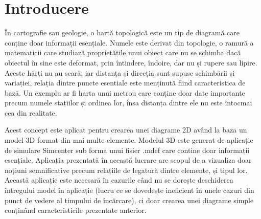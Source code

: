 \newpage
\section{Introducere}


În cartografie sau geologie, o hartă topologică este un tip de diagramă care conține doar informații esențiale. 
Numele este derivat din topologie, o ramură a matematicii care studiază proprietățile unui obiect care nu se schimba dacă 
obiectul în sine este deformat, prin întindere, îndoire, dar nu și rupere sau lipire. Aceste hărți nu au scară, iar distanța 
și direcția sunt supuse schimbării și variației, relația dintre puncte esentiale este menținută fiind caracteristica de bază. 
Un exemplu ar fi harta unui metrou care conține doar date importante precum numele stațiilor și ordinea lor, însa distanța 
dintre ele nu este întocmai cea din realitate. \newline

Acest concept este aplicat pentru crearea unei diagrame 2D având la baza un model 3D format din mai multe elemente.
Modelul 3D este generat de aplicație de simulare Simcenter sub forma unui fisier .mdef care contine doar informații esențiale.
Aplicația prezentată în această lucrare are scopul de a vizualiza doar noțiuni semnificative precum relațiile de legatură dintre elemente,
și tipul lor. Această aplicație este necesară în cazurile când nu se dorește deschiderea întregului model în aplicație 
(lucru ce se dovedește ineficient în unele cazuri din punct de vedere al timpului de încărcare), ci doar crearea unei diagrame simple 
conținând caracteristicile prezentate anterior.\newline
